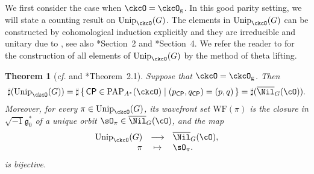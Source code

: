 \documentclass[12pt,a4paper]{amsart}
\newcommand{\trivial}[2][]{\if\relax\detokenize{#1}\relax
  {%
      \color{orange} \vspace{0em} $[$  #2 $]$
      \color{black}
  }
  \else
\ifx#1h
\ifcsname showtrivial\endcsname
{%
    \color{orange} \vspace{0em}  $[$ #2 $]$
    \color{black}
}
\fi
\else {\red Wrong argument!} \fi
\fi
}
\newcommand{\WF}{\mathrm{WF}}
\newcommand{\CP}{{\mathcal {P}}}
\newcommand{\g}{\mathfrak g}
\numberwithin{equation}{section}
\newtheorem{thm}{Theorem}[section]
\theoremstyle{remark}
\def\cf{\emph{cf.} }
\def\Unip{\mathrm{Unip}}
\def\CP{\mathsf{CP}}
\def\Cint#1{\Coh_{[#1]}}
\def\Coh{\mathrm{Coh}}
\begin{document}
We first consider the case when  $\ckcO = \ckcO_{\mathrm g}$.
In this good parity setting, we will state a counting result on
$\Unip_{\ckcO}(G)$. The elements in $\Unip_{\ckcO}(G)$ can be constructed by
cohomological induction explicitly and they are irreducible and unitary due to
\cite{Mat96,Tr.U}, see also \cite{Tr.H}*{Section~2} and \cite{MR.U}*{Section~4}.
We refer the reader to \cite{BMSZ2} for the construction of all elements of $\Unip_{\ckcO}(G)$ by the method of theta lifting.


\begin{thm}[\cf {\cite[Theorem 4.2]{BV.W} and \cite{Tr.H}*{Theorem~2.1}}]\label{thmunit0}
  Suppose that $\ckcO = \ckcO_{\mathrm g}$. Then
  \begin{equation} \label{sharpuni0} \sharp(\Unip_{\ckcO}(G))= \sharp \set{\CP\in \mathrm{PAP}_{A^*}(\ckcO)|(p_\CP, q_\CP)=(p,q)}=\sharp(\overline \Nil_{G}(\cO)).
  \end{equation}
  Moreover, for every $\pi\in \Unip_{\ckcO}(G)$, its wavefront set $\WF(\pi)$ is
  the closure in $\sqrt{-1}\g_0^*$ of a unique orbit
  $\sO_\pi\in \overline \Nil_{G}(\cO)$, and the map
  \begin{equation}\label{sharpuni1}
    \begin{array}{rcl}
      \Unip_{\ckcO}(G) &\longrightarrow& \overline \Nil_{G}(\cO), \\%
      \pi & \mapsto & \sO_\pi.
    \end{array}
  \end{equation}
  is bijective.
\end{thm}
\end{document}
